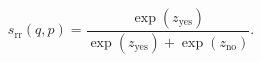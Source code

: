 \[
s_{\mathrm{rr}}(q,p)=\frac{\exp(z_{\mathrm{yes}})}{\exp(z_{\mathrm{yes}})+\exp(z_{\mathrm{no}})}.
\]
